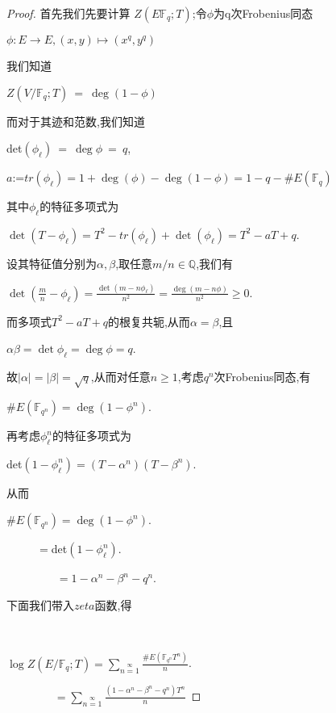 \documentclass[11pt]{ctexart}
\DeclareMathOperator{\Deg}{deg}
\begin{document}
\begin{proof}

首先我们先要计算 $Z(E\mathbb{F}_q;T)$;令$\phi$为q次Frobenius同态
\begin{center}
    $\phi:E \rightarrow E$$,(x,y)\mapsto (x^q,y^q)$
\end{center}
我们知道
\begin{center}
    $Z(V/\mathbb{F}_q;T)~=~\Deg(1-\phi)$
\end{center}
而对于其迹和范数,我们知道
\begin{center}
    det$(\phi_{\ell})~=~\Deg \phi~=~q$,

    $a$:=$tr(\phi_{\ell})=1+\Deg(\phi)-\Deg(1-\phi)=1-q-\#E(\mathbb{F}_q)$
\end{center}
其中$\phi_{\ell}$的特征多项式为
\begin{center}
    $\det(T-\phi_{\ell})=T^2-tr(\phi_{\ell})+\det(\phi_{\ell})=T^2-aT+q$.
\end{center}
设其特征值分别为$\alpha,\beta$,取任意$m/n \in \mathbb{Q}$,我们有
\begin{center}
    $\det(\frac{m}{n}-\phi_{\ell})=\frac{\det(m-n\phi_{\ell})}{n^2}=\frac{\Deg(m-n\phi)}{n^2}\geqslant 0$.
\end{center}
而多项式$T^2-aT+q$的根复共轭,从而$\alpha=\beta$,且
\begin{center}
    $\alpha\beta=\det\phi_{\ell}=\Deg\phi=q$.
\end{center}
故$|\alpha|=|\beta|=\sqrt{q}$,从而对任意$n\geqslant 1$,考虑$q^{n}$次Frobenius同态,有
\begin{center}
    $\#E(\mathbb{F}_{q^n})=\Deg(1-\phi^n)$.
\end{center}
再考虑$\phi_{\ell}^n$的特征多项式为
\begin{center}
    det$(1-\phi_{\ell}^n)=(T-\alpha^n)(T-\beta^n)$.
\end{center}
从而
\begin{center}
    $\#E(\mathbb{F}_{q^n})=\Deg(1-\phi^n)$.

    $~~~~~~~~~~~~=$det$(1-\phi_{\ell}^n)$.

    $~~~~~~~~~~~~~~~~~~~~=1-\alpha^n-\beta^n-q^n$.
\end{center}
下面我们带入$zeta$函数,得

~

    $\log Z(E/\mathbb{F}_q;T)=\sum\limits_{n=1}\limits^{\infty}\frac{\#E(\mathbb{F}_{q^n}T^n)}{n}$.

    $~~~~~~~~~~~~~~~~~~~=\sum\limits_{n=1}\limits^{\infty}\frac{(1-\alpha^n-\beta^n-q^n)T^n}{n}$


\end{proof}
\end{document}
